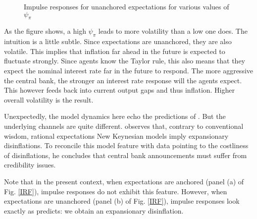 \documentclass[11pt]{article}
\def \myFigPath {../../figures/}
\renewcommand{\[}{\begin{equation}}
\renewcommand{\]}{\end{equation}}
\def\mySmallerFigScale{0.18}
\begin{document}
\begin{figure}[h!]
\caption{Impulse responses for unanchored expectations for various values of $\psi_{\pi}$}
\floatfoot{}
\label{IRF_unanchored_psi}
\end{figure}

As the figure shows, a high $\psi_{\pi}$ leads to more volatility than a low one does. The intuition is a little subtle. Since expectations are unanchored, they are also volatile. This implies that inflation far ahead in the future is expected to fluctuate strongly. Since agents know the Taylor rule, this also means that they expect the nominal interest rate far in the future to respond. The more aggressive the central bank, the stronger an interest rate response will the agents expect. This however feeds back into current output gaps and thus inflation. Higher overall volatility is the result.

Unexpectedly, the model dynamics here echo the predictions of \cite{ball1994credible}. But the underlying channels are quite different. \cite{ball1994credible} observes that, contrary to conventional wisdom, rational expectations New Keynesian models imply expansionary disinflations. To reconcile this model feature with data pointing to the costliness of disinflations, he concludes that central bank announcements must suffer from credibility issues. 

Note that in the present context, when expectations are anchored (panel (a) of Fig. \ref{IRF}), impulse responses do not exhibit this feature. However, when expectations are unanchored (panel (b) of Fig. \ref{IRF}), impulse responses look exactly as \cite{ball1994credible} predicts: we obtain an expansionary disinflation. 
\end{document}
